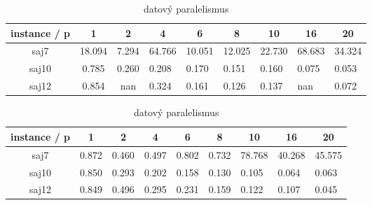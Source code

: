 \documentclass{article}
\begin{document}
    \begin{table}[h]
        \begin{subtable}{.5\linewidth}\centering
        \begin{tabular}{|c|c|c|l|l|l|l|l|l|}
            \hline
            \textbf{instance / p} &
            \textbf{1} &
            \textbf{2} &
            \multicolumn{1}{c|}{\textbf{4}} &
            \multicolumn{1}{c|}{\textbf{6}} &
            \multicolumn{1}{c|}{\textbf{8}} &
            \multicolumn{1}{c|}{\textbf{10}} &
            \multicolumn{1}{c|}{\textbf{16}} &
            \multicolumn{1}{c|}{\textbf{20}} \\ \hline
            saj7 &
                {\color[HTML]{FE0000} 18.094} &
                {\color[HTML]{FE0000} 7.294} &
                {\color[HTML]{FE0000} 64.766} &
                {\color[HTML]{FE0000} 10.051} &
                {\color[HTML]{FE0000} 12.025} &
                {\color[HTML]{FE0000} 22.730} &
                {\color[HTML]{FE0000} 68.683} &
                {\color[HTML]{FE0000} 34.324} \\ \hline
            saj10 & 0.785 & 0.260 & 0.208 & 0.170 & 0.151 & 0.160 & 0.075 & 0.053 \\ \hline
            saj12 & 0.854 & nan   & 0.324 & 0.161 & 0.126 & 0.137 & nan   & 0.072 \\ \hline
        \end{tabular}
        \caption{taskový paralelismus}
        \label{tab:efektivita-openmp-task}
        \end{subtable}%

        \begin{subtable}{.5\linewidth}\centering
        \begin{tabular}{|c|c|c|l|l|l|l|l|l|}
            \hline
            \textbf{instance / p} &
            \textbf{1} &
            \textbf{2} &
            \multicolumn{1}{c|}{\textbf{4}} &
            \multicolumn{1}{c|}{\textbf{6}} &
            \multicolumn{1}{c|}{\textbf{8}} &
            \multicolumn{1}{c|}{\textbf{10}} &
            \multicolumn{1}{c|}{\textbf{16}} &
            \multicolumn{1}{c|}{\textbf{20}} \\ \hline
            saj7  & 0.872 & 0.460 & 0.497 & 0.802 & 0.732 & {\color[HTML]{FE0000} 78.768} & {\color[HTML]{FE0000} 40.268} & {\color[HTML]{FE0000} 45.575} \\ \hline
            saj10 & 0.850 & 0.293 & 0.202 & 0.158 & 0.130 & 0.105                         & 0.064                         & 0.063                         \\ \hline
            saj12 & 0.849 & 0.496 & 0.295 & 0.231 & 0.159 & 0.122                         & 0.107                         & 0.045                         \\ \hline
        \end{tabular}
        \caption{datový paralelismus}
        \label{tab:efektivita-openmp-data}
    \end{subtable}%


\end{table}
\end{document}

